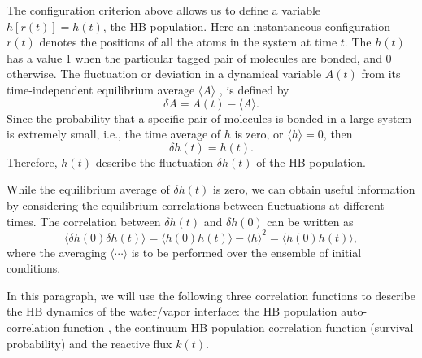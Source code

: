 The configuration criterion above allows us to define a variable $h[r(t)] = h(t)$, the HB population. 
Here an instantaneous configuration $r(t)$ denotes the positions of all the atoms in the system at time $t$.\cite{AL96}  
The $h(t)$ has a value 1 when the particular tagged pair of molecules are bonded, and 0 otherwise. 
The fluctuation or deviation in a dynamical variable $A(t)$ from its time-independent equilibrium average $\langle A\rangle$ , 
is defined by \cite{DC87} 
$$
\delta A = A(t) - \langle A\rangle.
$$
Since the probability that a specific pair of molecules is bonded in a large system is extremely small, i.e., 
the time average of $h$ is zero, or  
$\langle h \rangle = 0$,
then
$$
\delta h(t) = h(t).
$$
Therefore, $h(t)$ describe the fluctuation $\delta h(t)$  of the HB population.  

While the equilibrium average of $\delta h(t)$ is zero, we can obtain useful information by considering the equilibrium 
correlations between fluctuations at different times. The correlation between $\delta h(t)$ and $\delta h(0)$ can be written as 
$$
\langle \delta h(0) \delta h(t)\rangle = \langle h(0)h(t)\rangle-\langle h \rangle^2 = \langle h(0)h(t)\rangle,
$$
where the averaging $\langle\cdots\rangle$ is to be performed over the ensemble of initial conditions.%


In this paragraph, we will use the following three correlation functions to describe the HB dynamics of the water/vapor interface:
the HB population auto-correlation function \CHB, the continuum HB population correlation function (survival probability) \SHB and the reactive flux $k(t)$. \cite{Rapaport1983}

\FloatBarrier
